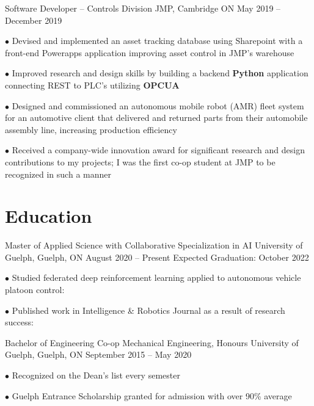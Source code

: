 \documentclass[a4paper,11pt]{article}
\newcommand{\sectionsep}{\vspace{-2.5mm}}
\begin{document}
\newpage
\resumeExp
{Software Developer -- Controls Division}
{JMP, Cambridge ON}
{May 2019 -- December 2019}
{}
\resumeItemListStart
\item[$\bullet$] Devised and implemented an asset tracking database using Sharepoint with a front-end
Powerapps application improving asset control in JMP's warehouse
\item[$\bullet$] Improved research and design skills by building a backend \textbf{Python} application connecting REST
to PLC's utilizing \textbf{OPCUA}
\item[$\bullet$] Designed and commissioned an autonomous mobile robot (AMR) fleet system for an automotive client that delivered and
returned parts from their automobile assembly line, increasing production efficiency
\item[$\bullet$] Received a company-wide innovation award for significant research and design contributions to
my projects; I was the first co-op student at JMP to be recognized in such a manner
\resumeItemListEnd

\resumeSubHeadingListEnd
\sectionsep
\section{Education}

\resumeSubHeadingListStart
\resumeEdu
{Master of Applied Science with Collaborative Specialization in AI}
{University of Guelph, Guelph, ON}
{August 2020 -- Present} %
{Expected Graduation: October 2022}
\resumeItemListStart
\item[$\bullet$] Studied federated deep reinforcement learning applied to autonomous vehicle platoon control:
\href{https://atrium.lib.uoguelph.ca/xmlui/handle/10214/27063}{\footnotesize{\faExternalLink}}
\item[$\bullet$] Published work in Intelligence \& Robotics Journal as a result of research success:
\href{https://intellrobot.com/article/view/4885}{\footnotesize{\faExternalLink}}
\resumeItemListEnd

\resumeEdu
{Bachelor of Engineering Co-op Mechanical Engineering, Honours }
{University of Guelph, Guelph, ON}
{September 2015 -- May 2020}
{}

\resumeItemListStart
\item[$\bullet$] Recognized on the Dean's list every semester
\item[$\bullet$] Guelph Entrance Scholarship granted for admission with over 90\% average
\resumeItemListEnd
\resumeSubHeadingListEnd
\sectionsep
\end{document}
